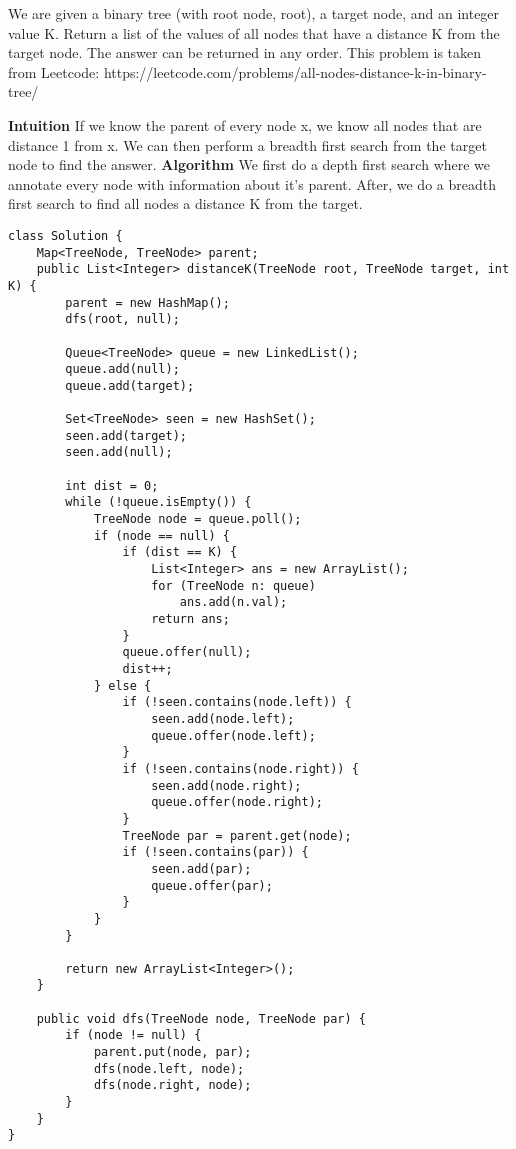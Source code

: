 \question We are given a binary tree (with root node, root), a target node, and an integer value K. Return a list of the values of all nodes that have a distance K from the target node.  The answer can be returned in any order.\newline\newline 
This problem is taken from Leetcode: https://leetcode.com/problems/all-nodes-distance-k-in-binary-tree/
\begin{solution}[1in]
\textbf{Intuition}\newline
If we know the parent of every node x, we know all nodes that are distance 1 from x. We can then perform a breadth first search from the target node to find the answer.\newline\newline
\textbf{Algorithm}\newline
We first do a depth first search where we annotate every node with information about it's parent.\newline
After, we do a breadth first search to find all nodes a distance K from the target.\newline
\begin{lstlisting}
class Solution {
    Map<TreeNode, TreeNode> parent;
    public List<Integer> distanceK(TreeNode root, TreeNode target, int K) {
        parent = new HashMap();
        dfs(root, null);

        Queue<TreeNode> queue = new LinkedList();
        queue.add(null);
        queue.add(target);

        Set<TreeNode> seen = new HashSet();
        seen.add(target);
        seen.add(null);

        int dist = 0;
        while (!queue.isEmpty()) {
            TreeNode node = queue.poll();
            if (node == null) {
                if (dist == K) {
                    List<Integer> ans = new ArrayList();
                    for (TreeNode n: queue)
                        ans.add(n.val);
                    return ans;
                }
                queue.offer(null);
                dist++;
            } else {
                if (!seen.contains(node.left)) {
                    seen.add(node.left);
                    queue.offer(node.left);
                }
                if (!seen.contains(node.right)) {
                    seen.add(node.right);
                    queue.offer(node.right);
                }
                TreeNode par = parent.get(node);
                if (!seen.contains(par)) {
                    seen.add(par);
                    queue.offer(par);
                }
            }
        }

        return new ArrayList<Integer>();
    }

    public void dfs(TreeNode node, TreeNode par) {
        if (node != null) {
            parent.put(node, par);
            dfs(node.left, node);
            dfs(node.right, node);
        }
    }
}
\end{lstlisting}
\end{solution}